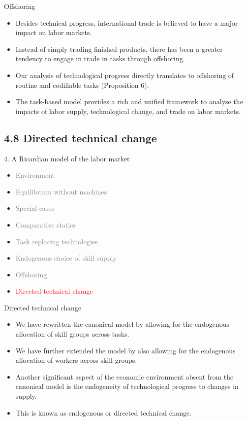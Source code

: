 \documentclass[notes=show]{beamer}
\begin{document}
\begin{frame}{Offshoring}
\begin{itemize}
\item Besides technical progress, international trade is believed to have a major impact on labor markets. \medskip
\item Instead of simply trading finished products, there has been a greater tendency to engage in trade in tasks through offshoring. \medskip
\item Our analysis of technological progress directly translates to offshoring of routine and codifiable tasks (Proposition 6). \medskip
\item The task-based model provides a rich and unified framework to analyse the impacts of labor supply, technological change, and trade on labor markets.
\end{itemize}
\end{frame}

\subsection{4.8 Directed technical change}

\begin{frame}{4. A Ricardian model of the labor market}
\begin{itemize}
\item[\textcolor{gray}{4.1}] \textcolor{gray}{Environment}
\item[\textcolor{gray}{4.2}] \textcolor{gray}{Equilibrium without machines}
\item[\textcolor{gray}{4.3}] \textcolor{gray}{Special cases}
\item[\textcolor{gray}{4.4}] \textcolor{gray}{Comparative statics}
\item[\textcolor{gray}{4.5}] \textcolor{gray}{Task replacing technologies}
\item[\textcolor{gray}{4.6}] \textcolor{gray}{Endogenous choice of skill supply}
\item[\textcolor{gray}{4.7}] \textcolor{gray}{Offshoring}
\item[\textcolor{red}{4.8}] \textcolor{red}{Directed technical change}
\end{itemize}
\end{frame}

\begin{frame}{Directed technical change}
\begin{itemize}
\item We have rewritten the canonical model by allowing for the endogenous allocation of skill groups across tasks. \medskip
\item We have further extended the model by also allowing for the endogenous allocation of workers across skill groups. \medskip
\item Another significant aspect of the economic environment absent from the canonical model is the endogeneity of technological progress to changes in supply. \medskip
\item This is known as endogenous or directed technical change.
\end{itemize}
\end{frame}
\end{document}
